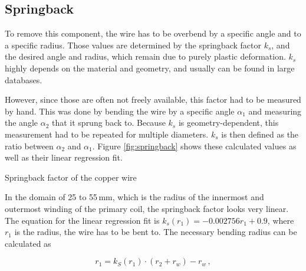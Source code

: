\subsection{Springback}

To remove this component, the wire has to be overbend by a specific angle and to a specific radius. Those values are determined by the springback factor \(k_s\), and the desired angle and radius, which remain due to purely plastic deformation. \(k_s\) highly depends on the material and geometry, and usually can be found in large databases.

However, since those are often not freely available, this factor had to be measured by hand. This was done by bending the wire by a specific angle \(\alpha_1\) and measuring the angle \(\alpha_2\) that it sprung back to. Because \(k_s\) is geometry-dependent, this measurement had to be repeated for multiple diameters. \(k_s\) is then defined as the ratio between \(\alpha_2\) and \(\alpha_1\). Figure \ref{fig:springback} shows these calculated values as well as their linear regression fit.

\begin{marginfigure}[-1cm]
    \centering
    \caption{Springback factor of the copper wire}
    \label{fig:springback}
\end{marginfigure}

In the domain of 25 to 55\,mm, which is the radius of the innermost and outermost winding of the primary coil, the springback factor looks very linear. The equation for the linear regression fit is \(k_s(r_1) = -0.002756 r_1 + 0.9\), where \(r_1\) is the radius, the wire has to be bent to. The necessary bending radius can be calculated as

\begin{equation}
    r_1 = k_S(r_1) \cdot \left(r_2 + r_w\right) - r_w\,,
\end{equation}

